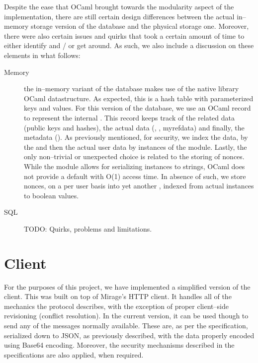 Despite the ease that OCaml brought towards the modularity aspect of the implementation, there are still certain design differences between the actual in--memory storage version of the database and the physical storage one.
Moreover, there were also certain issues and quirks that took a certain amount of time to either identify and / or get around.
As such, we also include a discussion on these elements in what follows:
\begin{description}
  \item[Memory] the in--memory variant of the database makes use of the native library OCaml  datastructure.
  As expected, this is a hash table with parameterized keys and values.
  For this version of the database, we use an OCaml record to represent the internal .
  This record keeps track of the  related data (public keys and hashes), the actual data (, , myref{data}) and finally, the metadata ().
  As previously mentioned, for security, we index the  data, by the  and then the actual user data by instances of the  module.
  Lastly, the only non--trivial or unexpected choice is related to the storing of nonces.
  While the  module allows for serializing instances to strings, OCaml does not provide a default  with O(1) access time.
  In absence of such, we store nonces, on a per user basis into yet another , indexed from actual  instances to boolean values.

  \label{sec:implementation:sql}
  \item[SQL] TODO: Quirks, problems and limitations.
\end{description}

\section{Client}
For the purposes of this project, we have implemented a simplified version of the client.
This was built on top of Mirage's  HTTP client.
It handles all of the mechanics the protocol describes, with the exception of proper client--side revisioning (conflict resolution).
In the current version, it can be used though to send any of the messages normally available.
These are, as per the specification, serialized down to JSON, as previously described, with the data properly encoded using Base64 encoding.
Moreover, the security mechanisms described in the specifications are also applied, when required.

